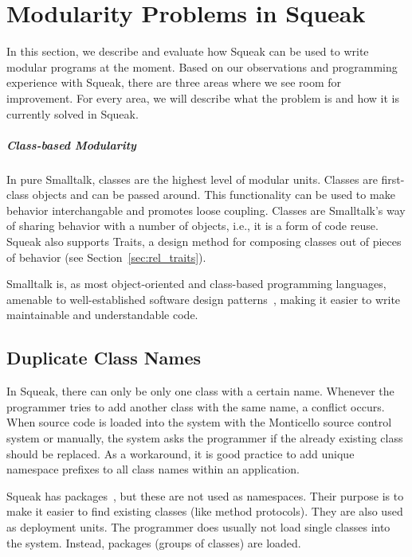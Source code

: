 \chapter{Modularity Problems in Squeak}
\label{sec:problem}
In this section, we describe and evaluate how Squeak can be used to write modular programs at the moment. Based on our observations and programming experience with Squeak, there are three areas where we see room for improvement. For every area, we will describe what the problem is and how it is currently solved in Squeak.

\paragraph{Class-based Modularity}
In pure Smalltalk, classes are the highest level of modular units. Classes are first-class objects and can be passed around. This functionality can be used to make behavior interchangable and promotes loose coupling. Classes are Smalltalk's way of sharing behavior with a number of objects, i.e., it is a form of code reuse. Squeak also supports Traits, a design method for composing classes out of pieces of behavior (see Section~\ref{sec:rel_traits}).

Smalltalk is, as most object-oriented and class-based programming languages, amenable to well-established software design patterns~\cite{Gamma:1995:DPE:186897}, making it easier to write maintainable and understandable code.

\section{Duplicate Class Names}
In Squeak, there can only be only one class with a certain name. Whenever the programmer tries to add another class with the same name, a conflict occurs. When source code is loaded into the system with the Monticello source control system or manually, the system asks the programmer if the already existing class should be replaced. As a workaround, it is good practice to add unique namespace prefixes to all class names within an application. 

Squeak has packages~\cite{Nierstrasz:2009:SE:1816759}, but these are not used as namespaces. Their purpose is to make it easier to find existing classes (like method protocols). They are also used as deployment units. The programmer does usually not load single classes into the system. Instead, packages (groups of classes) are loaded. 

